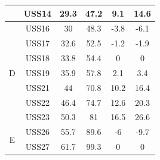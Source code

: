\begin{linenumbers}
\begin{table}[htbp]
\begin{tabular}{cccccc}
		& USS14  & 29.3 &           47.2            & 9.1  &            14.6            \\ \midrule
		\multirow{7}{*}{D}                 & USS16  &  30  &           48.3            & -3.8 &            -6.1            \\
		& USS17  & 32.6 &           52.5            & -1.2 &            -1.9            \\
		& USS18  & 33.8 &           54.4            &  0   &             0              \\
		& USS19  & 35.9 &           57.8            & 2.1  &            3.4             \\
		& USS21  &  44  &           70.8            & 10.2 &            16.4            \\
		& USS22  & 46.4 &           74.7            & 12.6 &            20.3            \\
		& USS23  & 50.3 &            81             & 16.5 &            26.6            \\ \midrule
		\multirow{2}{*}{E}                 & USS26  & 55.7 &           89.6            &  -6  &            -9.7            \\
		& USS27  & 61.7 &           99.3            &  0   &             0              \\ \bottomrule
	\end{tabular}
\end{table}


\end{linenumbers}
